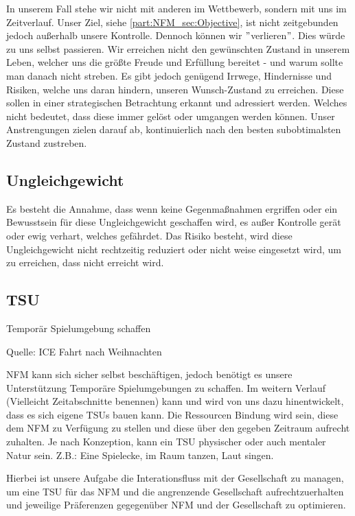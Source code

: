 In unserem Fall stehe wir nicht mit anderen im Wettbewerb, sondern mit uns im Zeitverlauf. Unser Ziel, siehe \ref{part:NFM_sec:Objective}, ist nicht zeitgebunden jedoch außerhalb unsere Kontrolle. Dennoch können wir $"$verlieren$"$. Dies würde zu uns selbst passieren. Wir erreichen nicht den gewünschten Zustand in unserem Leben, welcher uns die größte Freude und Erfüllung bereitet - und warum sollte man danach nicht streben. Es gibt jedoch genügend Irrwege, Hindernisse und Risiken, welche uns daran hindern, unseren Wunsch-Zustand zu erreichen. Diese sollen in einer strategischen Betrachtung erkannt und adressiert werden. Welches nicht bedeutet, dass diese immer gelöst oder umgangen werden können. Unser Anstrengungen zielen darauf ab, kontinuierlich nach den besten subobtimalsten Zustand zustreben.\\


\subsection{Ungleichgewicht}

Es besteht die Annahme, dass wenn keine Gegenmaßnahmen ergriffen oder ein Bewusstsein für diese Ungleichgewicht geschaffen wird, es außer Kontrolle gerät oder ewig verhart, welches \NFMOTwo gefährdet. 
Das Risiko besteht, wird diese Ungleichgewicht nicht rechtzeitig reduziert oder nicht weise eingesetzt wird, um \NFMOOne zu erreichen, dass \NFMOTwo nicht erreicht wird.\\


\subsection{TSU}

Temporär Spielumgebung schaffen

Quelle: ICE Fahrt nach Weihnachten

NFM kann sich sicher selbst beschäftigen, jedoch benötigt es unsere Unterstützung Temporäre Spielumgebungen zu schaffen. Im weitern Verlauf (Vielleicht Zeitabschnitte benennen) kann und wird von uns dazu hinentwickelt, dass es sich eigene TSUs bauen kann. Die Ressourcen Bindung wird sein, diese dem NFM zu Verfügung zu stellen und diese über den gegeben Zeitraum aufrecht zuhalten. Je nach Konzeption, kann ein TSU physischer oder auch mentaler Natur sein. Z.B.: Eine Spielecke, im Raum tanzen, Laut singen. 

Hierbei ist unsere Aufgabe die Interationsfluss mit der Gesellschaft zu managen, um eine TSU für das NFM und die angrenzende Gesellschaft aufrechtzuerhalten und jeweilige Präferenzen gegegenüber NFM und der Gesellschaft zu optimieren.

